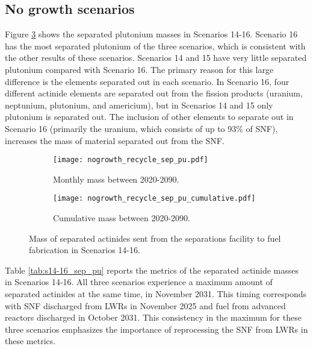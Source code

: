 \subsection{No growth scenarios}
Figure \ref{fig:nogrowth_recycle_sep_pu} shows the separated plutonium 
masses in Scenarios 14-16. Scenario 16 has the most separated 
plutonium of the three scenarios, which is consistent with the other 
results of these scenarios. Scenarios 14 and 15 have very little 
separated plutonium compared with Scenario 16. The primary reason 
for this large difference is the elements separated out in 
each scenario. In Scenario 16, four different actinide elements 
are separated out from the fission products (uranium, neptunium,
plutonium, and americium), but in Scenarios 14 and 15 only plutonium 
is separated out. The inclusion of other elements to separate out 
in Scenario 16 (primarily the uranium, which consists of up to 
93\% of \gls{SNF}), increases the mass of material  
separated out from the \gls{SNF}. 

\begin{figure}[h!]
    \centering
    \begin{subfigure}[b]{0.49\textwidth}
        \centering
        \texttt{[image: nogrowth\_recycle\_sep\_pu.pdf]}
        \caption{Monthly mass between 2020-2090.}
        \label{fig:nogrowth_recycle_sep_pu_all}
    \end{subfigure}
    \hfill
    \begin{subfigure}[b]{0.49\textwidth}
        \centering
        \texttt{[image: nogrowth\_recycle\_sep\_pu\_cumulative.pdf]}
        \caption{Cumulative mass between 2020-2090.}
        \label{fig:nogrowth_recycle_sep_pu_cumulative}
    \end{subfigure}
       \caption{Mass of separated actinides sent from the 
       separations facility to fuel fabrication in Scenarios 14-16.}
       \label{fig:nogrowth_recycle_sep_pu}
\end{figure}

Table \ref{tab:s14-16_sep_pu} reports the metrics of the separated 
actinide masses in Scenarios 14-16. All three scenarios experience a 
maximum amount of separated actinides at the same time, in 
November 2031. This timing corresponds with \gls{SNF} discharged 
from \glspl{LWR} in November 2025 and fuel from advanced reactors
discharged in October 2031. This consistency in the maximum 
for these three scenarios emphasizes the importance of reprocessing 
the \gls{SNF} from \glspl{LWR} in these metrics.  

